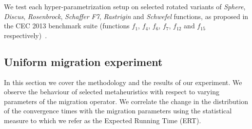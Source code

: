 \documentclass{sig-alternate}
\begin{document}
We test each hyper-parametrization setup on selected rotated variants of \emph{Sphere}, \emph{Discus}, \emph{Rosenbrock}, \emph{Schaffer F7}, \emph{Rastrigin} and \emph{Schwefel} functions, as proposed in the CEC 2013 benchmark suite (functions $f_1$, $f_4$, $f_6$, $f_7$, $f_{12}$ and $f_{15}$ respectively)~\cite{liang2013problem}.


\subsection{Uniform migration experiment}
In this section we cover the methodology and the results of our experiment.
We observe the behaviour of selected metaheuristics with respect to varying parameters of the migration operator.
We correlate the change in the distribution of the convergence times with the migration parameters using the statistical measure to which we refer as the Expected Running Time (ERT).
\end{document}
